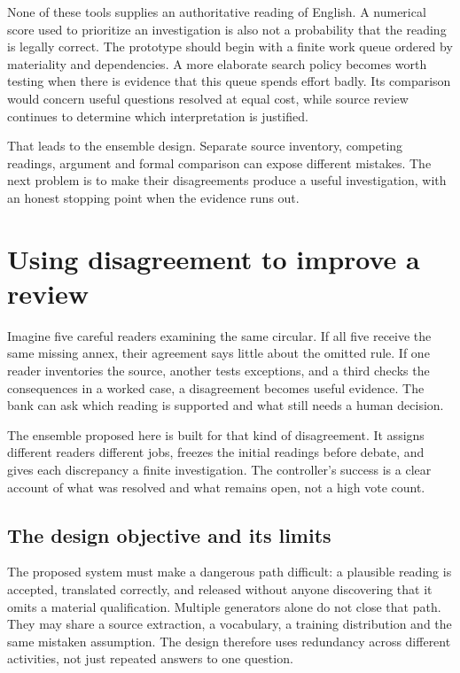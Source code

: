 \documentclass[12pt,a4paper,oneside,openany]{book}
\begin{document}
None of these tools supplies an authoritative reading of English. A numerical
score used to prioritize an investigation is also not a probability that the
reading is legally correct. The prototype should begin with a finite work queue
ordered by materiality and dependencies. A more elaborate search policy becomes
worth testing when there is evidence that this queue spends effort badly. Its
comparison would concern useful questions resolved at equal cost, while source
review continues to determine which interpretation is justified.

That leads to the ensemble design. Separate source inventory, competing readings,
argument and formal comparison can expose different mistakes. The next problem
is to make their disagreements produce a useful investigation, with an honest
stopping point when the evidence runs out.

\chapter{Using disagreement to improve a review}
\label{ch:ensemble}

Imagine five careful readers examining the same circular. If all five receive
the same missing annex, their agreement says little about the omitted rule. If
one reader inventories the source, another tests exceptions, and a third checks
the consequences in a worked case, a disagreement becomes useful evidence. The
bank can ask which reading is supported and what still needs a human decision.

The ensemble proposed here is built for that kind of disagreement. It assigns
different readers different jobs, freezes the initial readings before debate,
and gives each discrepancy a finite investigation. The controller's success is
a clear account of what was resolved and what remains open, not a high vote
count.


\section{The design objective and its limits}
\label{merge:M06:00}


The proposed system must make a dangerous path difficult: a plausible reading is
accepted, translated correctly, and released without anyone discovering that it
omits a material qualification. Multiple generators alone do not close that path.
They may share a source extraction, a vocabulary, a training distribution and the
same mistaken assumption. The design therefore uses redundancy across different
activities, not just repeated answers to one question.
\end{document}
